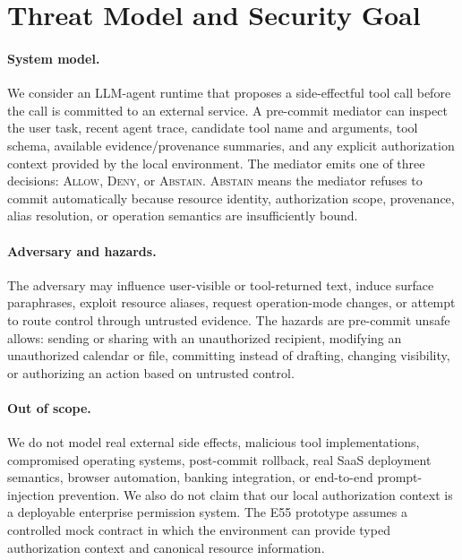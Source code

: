 \section{Threat Model and Security Goal}

\paragraph{System model.}
We consider an LLM-agent runtime that proposes a side-effectful tool call before the call is committed to an external service. A pre-commit mediator can inspect the user task, recent agent trace, candidate tool name and arguments, tool schema, available evidence/provenance summaries, and any explicit authorization context provided by the local environment. The mediator emits one of three decisions: \textsc{Allow}, \textsc{Deny}, or \textsc{Abstain}. \textsc{Abstain} means the mediator refuses to commit automatically because resource identity, authorization scope, provenance, alias resolution, or operation semantics are insufficiently bound.

\paragraph{Adversary and hazards.}
The adversary may influence user-visible or tool-returned text, induce surface paraphrases, exploit resource aliases, request operation-mode changes, or attempt to route control through untrusted evidence. The hazards are pre-commit unsafe allows: sending or sharing with an unauthorized recipient, modifying an unauthorized calendar or file, committing instead of drafting, changing visibility, or authorizing an action based on untrusted control.

\paragraph{Out of scope.}
We do not model real external side effects, malicious tool implementations, compromised operating systems, post-commit rollback, real SaaS deployment semantics, browser automation, banking integration, or end-to-end prompt-injection prevention. We also do not claim that our local authorization context is a deployable enterprise permission system. The E55 prototype assumes a controlled mock contract in which the environment can provide typed authorization context and canonical resource information.

